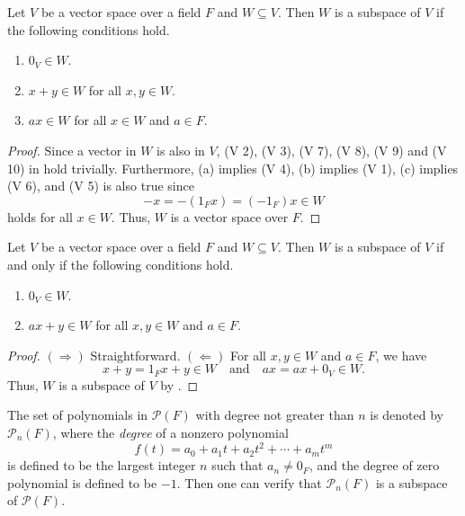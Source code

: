 \begin{theorem}\label{thm:subspace}
  Let $V$ be a vector space over a field $F$ and $W \subseteq V$.
  Then $W$ is a subspace of $V$ if the following conditions hold.
  \begin{enumerate}
    \item $0_V \in W$.
    \item $x + y \in W$ for all $x, y \in W$.
    \item $ax \in W$ for all $x \in W$ and $a \in F$.
  \end{enumerate}
\end{theorem}
\begin{proof}
  Since a vector in $W$ is also in $V$, (V 2), (V 3), (V 7), (V 8), (V 9) and
  (V 10) in  hold trivially.
  Furthermore, (a) implies (V 4), (b) implies (V 1), (c) implies (V 6), and
  (V 5) is also true since
  \begin{equation*}
    -x = -(1_Fx) = (-1_F)x \in W
  \end{equation*}
  holds for all $x \in W$.
  Thus, $W$ is a vector space over $F$.
\end{proof}

\begin{corollary}\label{cor:subspace}
  Let $V$ be a vector space over a field $F$ and $W \subseteq V$.
  Then $W$ is a subspace of $V$ if and only if the following conditions hold.
  \begin{enumerate}
    \item $0_V \in W$.
    \item $ax + y \in W$ for all $x, y \in W$ and $a \in F$.
  \end{enumerate}
\end{corollary}
\begin{proof}
  $(\Rightarrow)$ Straightforward.
  $(\Leftarrow)$ For all $x, y \in W$ and $a \in F$, we have
  \begin{equation*}
    x + y = 1_F x + y \in W
    \quad \text{and} \quad
    ax = ax + 0_V \in W.
  \end{equation*}
  Thus, $W$ is a subspace of $V$ by .
\end{proof}

\begin{example}
  The set of polynomials in $\mathcal{P}(F)$ with degree not greater than
  $n$ is denoted by $\mathcal{P}_n(F)$, where the \emph{degree} of a nonzero
  polynomial
  \begin{equation*}
    f(t) = a_0 + a_1t + a_2t^2 + \cdots + a_mt^m
  \end{equation*}
  is defined to be the largest integer $n$ such that $a_n \neq 0_F$, and the
  degree of zero polynomial is defined to be $-1$.
  Then one can verify that $\mathcal{P}_n(F)$ is a subspace of
  $\mathcal{P}(F)$.
\end{example}

